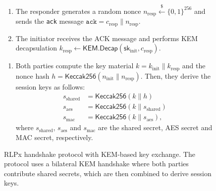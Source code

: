 \begin{figure}[!t]
\begin{tcolorbox}
\begin{enumerate}[leftmargin=*]
    \item The responder generates a random nonce $n_{\text{resp}}\overset{\$}{\leftarrow} \{0,1\}^{256}$ and sends the \texttt{ack} message $\texttt{ack} = c_{\text{resp}} \parallel n_{\text{resp}}$.
    
    \item The initiator receives the ACK message and performs KEM decapsulation $k_{\text{resp}} \leftarrow \mathsf{KEM.Decap}(\mathsf{sk}_{\text{init}}, c_{\text{resp}})$.
\end{enumerate}

\smallskip
{}
\begin{enumerate}[leftmargin=*]
\renewcommand{\labelenumi}{\arabic{enumi}.}
    \setcounter{enumi}{10}
    \item Both parties compute the key material $k = k_{\text{init}} \parallel k_{\text{resp}}$ and the nonce hash $h = \mathsf{Keccak256}(n_{\text{init}} \parallel n_{\text{resp}})$. 
    Then, they derive the session keys as follows:
    \begin{align*}
    s_\text{shared} &= \mathsf{Keccak256}(k \parallel h) \\
    s_\text{aes}  &= \mathsf{Keccak256}(k \parallel s_\text{shared} ) \\
    s_\text{mac}  &= \mathsf{Keccak256}(k \parallel s_\text{aes} ),
    \end{align*}
    where $s_\text{shared}$, $s_\text{aes}$ and $s_\text{mac}$ are the shared secret, AES secret and MAC secret, respectively.
\end{enumerate}
\end{tcolorbox}
\vspace{-0.2in}
\caption{RLPx handshake protocol with KEM-based key exchange. The protocol uses a bilateral KEM handshake where both parties contribute shared secrets, which are then combined to derive session keys.}
\label{fig:rlpx-handshake}
\vspace{-0.1in}
\end{figure}